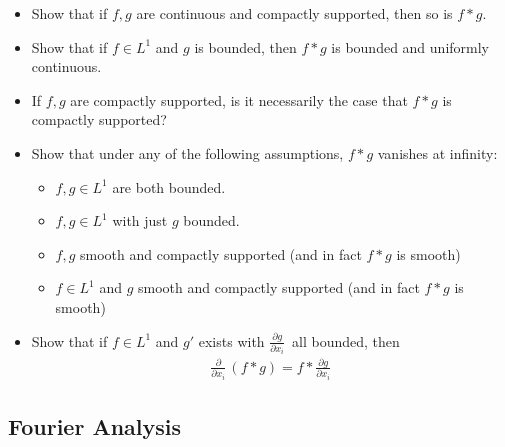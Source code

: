 \begin{itemize}
\tightlist
\item
  Show that if \(f, g\) are continuous and compactly supported, then so
  is \(f\ast g\).
\item
  Show that if \(f\in L^1\) and \(g\) is bounded, then \(f\ast g\) is
  bounded and uniformly continuous.
\item
  If \(f, g\) are compactly supported, is it necessarily the case that
  \(f\ast g\) is compactly supported?
\item
  Show that under any of the following assumptions, \(f\ast g\) vanishes
  at infinity:

  \begin{itemize}
  \tightlist
  \item
    \(f, g\in L^1\) are both bounded.
  \item
    \(f, g\in L^1\) with just \(g\) bounded.
  \item
    \(f, g\) smooth and compactly supported (and in fact \(f\ast g\) is
    smooth)
  \item
    \(f\in L^1\) and \(g\) smooth and compactly supported (and in fact
    \(f\ast g\) is smooth)
  \end{itemize}
\item
  Show that if \(f\in L^1\) and \(g'\) exists with
  \({\frac{\partial g}{\partial x_i}\,}\) all bounded, then
  \begin{align*}{\frac{\partial }{\partial x_i}\,}(f\ast g) = f \ast {\frac{\partial g}{\partial x_i}\,}\end{align*}
\end{itemize}

\hypertarget{fourier-analysis}{%
\subsection{Fourier Analysis}\label{fourier-analysis}}

